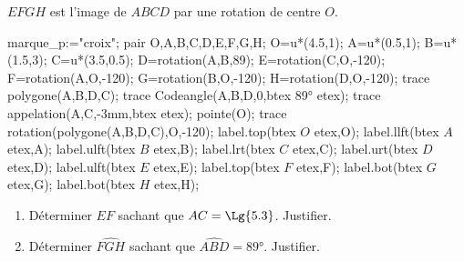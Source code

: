 \begin{exercice*}
    $EFGH$ est l'image de $ABCD$ par une rotation de centre $O$.\\
    \begin{Geometrie}[CoinHD={(8u,5u)}]
        marque_p:="croix";
        pair O,A,B,C,D,E,F,G,H;
        O=u*(4.5,1);
        A=u*(0.5,1);
        B=u*(1.5,3);
        C=u*(3.5,0.5);
        D=rotation(A,B,89);
        E=rotation(C,O,-120);
        F=rotation(A,O,-120);
        G=rotation(B,O,-120);
        H=rotation(D,O,-120);
        trace polygone(A,B,D,C);
        trace Codeangle(A,B,D,0,btex \ang{89} etex);
        trace appelation(A,C,-3mm,btex  etex);
        pointe(O);
        trace rotation(polygone(A,B,D,C),O,-120);
        label.top(btex $O$ etex,O);
        label.llft(btex $A$ etex,A);
        label.ulft(btex $B$ etex,B);
        label.lrt(btex $C$ etex,C);
        label.urt(btex $D$ etex,D);
        label.ulft(btex $E$ etex,E);
        label.top(btex $F$ etex,F);
        label.bot(btex $G$ etex,G);
        label.bot(btex $H$ etex,H);
    \end{Geometrie}
    \begin{enumerate}
        \item Déterminer $EF$ sachant que $AC=\Lg{5.3}$. Justifier.
        \item Déterminer $\widehat{FGH}$ sachant que $\widehat{ABD}=\ang{89}$. Justifier.
    \end{enumerate}    
\end{exercice*}
